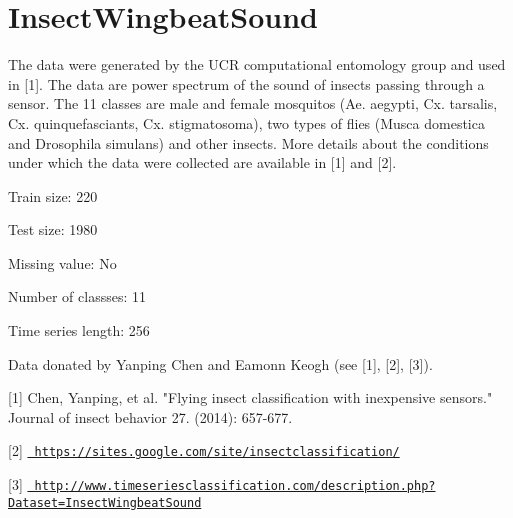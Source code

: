 \chapter{Insect\+Wingbeat\+Sound}
\hypertarget{md_external_2data_2UCRArchive__2018_2InsectWingbeatSound_2README}{}\label{md_external_2data_2UCRArchive__2018_2InsectWingbeatSound_2README}
\label{md_external_2data_2UCRArchive__2018_2InsectWingbeatSound_2README_autotoc_md131}%
%
 The data were generated by the UCR computational entomology group and used in \mbox{[}1\mbox{]}. The data are power spectrum of the sound of insects passing through a sensor. The 11 classes are male and female mosquitos (Ae. aegypti, Cx. tarsalis, Cx. quinquefasciants, Cx. stigmatosoma), two types of flies (Musca domestica and Drosophila simulans) and other insects. More details about the conditions under which the data were collected are available in \mbox{[}1\mbox{]} and \mbox{[}2\mbox{]}.

Train size\+: 220

Test size\+: 1980

Missing value\+: No

Number of classses\+: 11

Time series length\+: 256

Data donated by Yanping Chen and Eamonn Keogh (see \mbox{[}1\mbox{]}, \mbox{[}2\mbox{]}, \mbox{[}3\mbox{]}).

\mbox{[}1\mbox{]} Chen, Yanping, et al. "{}\+Flying insect classification with inexpensive sensors."{} Journal of insect behavior 27. (2014)\+: 657-\/677.

\mbox{[}2\mbox{]} \href{https://sites.google.com/site/insectclassification/}{\texttt{ https\+://sites.\+google.\+com/site/insectclassification/}}

\mbox{[}3\mbox{]} \href{http://www.timeseriesclassification.com/description.php?Dataset=InsectWingbeatSound}{\texttt{ http\+://www.\+timeseriesclassification.\+com/description.\+php?\+Dataset=\+Insect\+Wingbeat\+Sound}} 